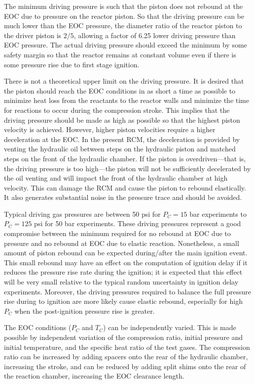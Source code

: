 \documentclass[12pt, letterpaper]{article}
\begin{document}
The minimum driving pressure is such that the piston does not rebound at
the EOC due to pressure on the reactor piston. So that the driving
pressure can be much lower than the EOC pressure, the diameter ratio of
the reactor piston to the driver piston is $2/5$, allowing a factor of
6.25 lower driving pressure than EOC pressure. The actual driving
pressure should exceed the minimum by some safety margin so that the
reactor remains at constant volume even if there is some pressure rise
due to first stage ignition.

There is not a theoretical upper limit on the driving pressure. It is desired that the piston should
reach the EOC conditions in as short a time as possible to minimize heat
loss from the reactants to the reactor walls and minimize the time for
reactions to occur during the compression stroke. This implies that the
driving pressure should be made as high as possible so that the highest
piston velocity is achieved. However, higher piston velocities require
a higher deceleration at the EOC. In the present RCM, the deceleration
is provided by venting the hydraulic oil between steps on the hydraulic
piston and matched steps on the front of the hydraulic chamber. If the
piston is overdriven---that is, the driving pressure is too high---the
piston will not be sufficiently decelerated by the oil venting and will
impact the front of the hydraulic chamber at high velocity. This can damage
the RCM and cause the piston to rebound elastically. It also generates
substantial noise in the pressure trace and should be avoided.

Typical driving gas pressures are between 50 psi for $P_C = 15$ bar experiments
to $P_C = 125$ psi for 50 bar experiments. These driving pressures represent a
good compromise between the minimum required for no rebound at EOC due
to pressure and no rebound at EOC due to elastic reaction. Nonetheless,
a small amount of piston rebound can be expected during/after the
main ignition event. This small rebound may have an effect on the computation of
ignition delay if it reduces the pressure rise rate during the ignition;
it is expected that this effect will be very small relative to the
typical random uncertainty in ignition delay experiments. Moreover,
the driving pressures required to balance the full pressure rise during
to ignition are more likely cause elastic rebound,
especially for high $P_C$ when the post-ignition pressure rise is greater.

The EOC conditions ($P_C$ and $T_C$) can be independently varied. This
is made possible by independent variation of the compression ratio,
initial pressure and initial temperature, and the specific heat ratio
of the test gases. The compression ratio can be
increased by adding spacers onto the rear of the hydraulic chamber,
increasing the stroke, and can be reduced by adding split shims onto
the rear of the reaction chamber, increasing the EOC clearance length.
\end{document}
